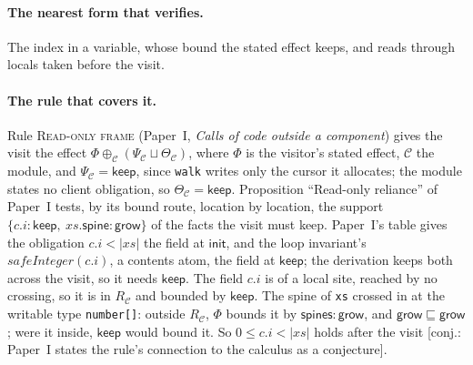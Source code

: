 \documentclass[10pt,a4paper]{article}
\theoremstyle{definition}
\theoremstyle{remark}
\newcommand{\kw}[1]{\mathsf{#1}}
\newcommand{\keep}{\kw{keep}}
\newcommand{\init}{\kw{init}}
\newcommand{\grow}{\kw{grow}}
\newcommand{\st}{\kw{spines}}
\newcommand{\len}[1]{|#1|}
\newcommand{\code}[1]{\texttt{#1}}
\newcommand{\status}[1]{\textsf{\small[#1]}}
\newcommand{\nI}[1]{Paper~I, \emph{#1}}
\newcommand{\entry}[1]{\paragraph{#1.}}
\begin{document}
\entry{The nearest form that verifies} The index in a variable, whose
bound the stated effect keeps, and reads through locals taken before
the visit.

\entry{The rule that covers it} Rule \textsc{Read-only frame}
(\nI{Calls of code outside a component}) gives the visit the effect
$\Phi\oplus_{\mathcal{C}}(\Psi_{\mathcal{C}}\sqcup\Theta_{\mathcal{C}})$, where $\Phi$
is the visitor's stated effect, $\mathcal{C}$ the module, and
$\Psi_{\mathcal{C}}=\keep$, since \code{walk} writes only the cursor it
allocates; the module states no client obligation, so
$\Theta_{\mathcal{C}}=\keep$. Proposition ``Read-only reliance'' of Paper~I
tests, by its bound route, location by location, the support
$\{c.i:\keep,\ \mathit{xs}.\kw{spine}:\grow\}$ of the facts the visit
must keep. Paper~I's table gives the obligation $c.i<\len{\mathit{xs}}$
the field at $\init$, and the loop invariant's
$\mathit{safeInteger}(c.i)$, a contents atom, the field at $\keep$; the
derivation keeps both across the visit, so it needs $\keep$. The field $c.i$ is of a local site,
reached by no crossing, so it is in $R_{\mathcal{C}}$ and bounded by
$\keep$. The spine of \code{xs} crossed in at the writable type
\code{number[]}: outside $R_{\mathcal{C}}$, $\Phi$ bounds it by
$\st:\grow$, and $\grow\sqsubseteq\grow$; were it inside, $\keep$ would
bound it. So $0\le c.i<\len{\mathit{xs}}$ holds after the visit
\status{conj.: Paper~I states the rule's connection to the calculus as a conjecture}.
\end{document}
